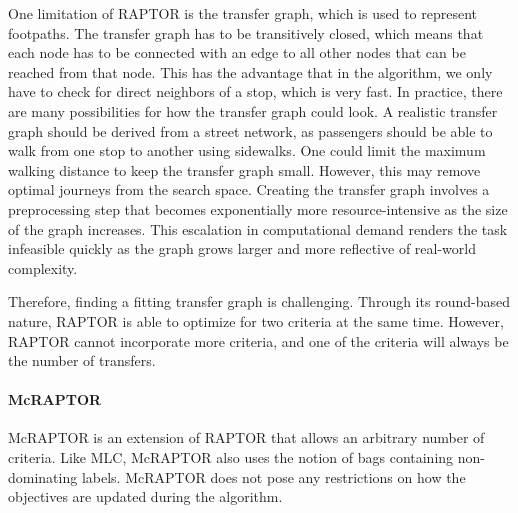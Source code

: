 One limitation of RAPTOR is the transfer graph, which is used to represent footpaths.
The transfer graph has to be transitively closed, which means that each node has to be connected with an edge to all other nodes that can be reached from that node.
This has the advantage that in the algorithm, we only have to check for direct neighbors of a stop, which is very fast.
In practice, there are many possibilities for how the transfer graph could look.
A realistic transfer graph should be derived from a street network, as passengers should be able to walk from one stop to another using sidewalks.
One could limit the maximum walking distance to keep the transfer graph small.
However, this may remove optimal journeys from the search space.
Creating the transfer graph involves a preprocessing step that becomes exponentially more resource-intensive as the size of the graph increases.
This escalation in computational demand renders the task infeasible quickly as the graph grows larger and more reflective of real-world complexity.

Therefore, finding a fitting transfer graph is challenging.
Through its round-based nature, RAPTOR is able to optimize for two criteria at the same time.
However, RAPTOR cannot incorporate more criteria, and one of the criteria will always be the number of transfers.


\paragraph{McRAPTOR}
\label{subsubsec:mcraptor}

McRAPTOR  is an extension of RAPTOR that allows an arbitrary number of criteria.
Like MLC, McRAPTOR also uses the notion of bags containing non-dominating labels.
McRAPTOR does not pose any restrictions on how the objectives are updated during the algorithm.

